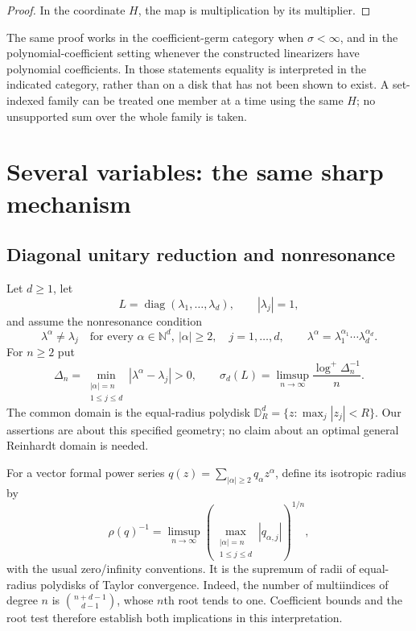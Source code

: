 \documentclass[11pt,a4paper]{article}
\numberwithin{equation}{section}
\theoremstyle{definition}
\theoremstyle{remark}
\newcommand{\N}{\mathbb N}
\begin{document}
\begin{proof}
In the coordinate $H$, the map is multiplication by its multiplier.
\end{proof}

The same proof works in the coefficient-germ category when $\sigma<\infty$,
and in the polynomial-coefficient setting whenever the constructed
linearizers have polynomial coefficients. In those statements equality is
interpreted in the indicated category, rather than on a disk that has not
been shown to exist. A set-indexed family can be treated one member at a
time using the same $H$; no unsupported sum over the whole family is taken.

\section{Several variables: the same sharp mechanism}\label{sec:several}

\subsection{Diagonal unitary reduction and nonresonance}

Let $d\ge1$, let
\[
 L=\operatorname{diag}(\lambda_1,\ldots,\lambda_d),\qquad
 |\lambda_j|=1,
\]
and assume the nonresonance condition
\begin{equation}\label{eq:multinonresonance}
 \lambda^\alpha\ne\lambda_j
 \quad\text{for every }\alpha\in\N^d,\ |\alpha|\ge2,
 \quad j=1,\ldots,d,
 \qquad\lambda^\alpha=\lambda_1^{\alpha_1}\cdots\lambda_d^{\alpha_d}.
\end{equation}
For $n\ge2$ put
\begin{equation}\label{eq:multisigma}
 \Delta_n=\min_{\substack{|\alpha|=n\\1\le j\le d}}
                 |\lambda^\alpha-\lambda_j|>0,
 \qquad
 \sigma_d(L)=\limsup_{n\to\infty}\frac{\log^+\Delta_n^{-1}}n.
\end{equation}
The common domain is the equal-radius polydisk
$\mathbb D_R^d=\{z:\max_j|z_j|<R\}$. Our assertions are about this
specified geometry; no claim about an optimal general Reinhardt domain
is needed.

For a vector formal power series $q(z)=\sum_{|\alpha|\ge2}q_\alpha z^\alpha$,
define its isotropic radius by
\begin{equation}\label{eq:isotropic}
 \rho(q)^{-1}=
 \limsup_{n\to\infty}
 \left(\max_{\substack{|\alpha|=n\\1\le j\le d}}
              |q_{\alpha,j}|\right)^{1/n},
\end{equation}
with the usual zero/infinity conventions. It is the supremum of radii
of equal-radius polydisks of Taylor convergence. Indeed, the number of
multiindices of degree $n$ is $\binom{n+d-1}{d-1}$, whose $n$th root
tends to one. Coefficient bounds and the root test therefore establish
both implications in this interpretation.
\end{document}
